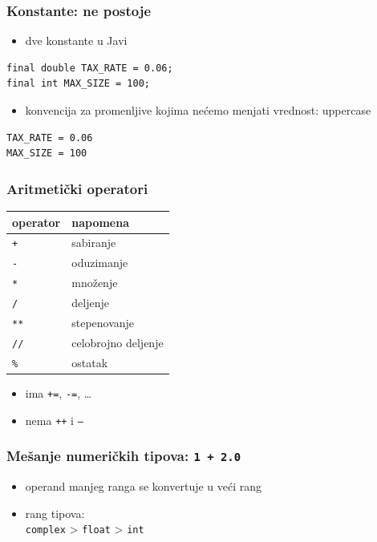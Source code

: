 \documentclass[compress]{beamer}
\begin{document}
\begin{frame}[fragile]
\frametitle{Konstante: ne postoje}
\begin{itemize}
  \item dve konstante u Javi
\end{itemize}
\begin{verbatim}
final double TAX_RATE = 0.06;
final int MAX_SIZE = 100;
\end{verbatim}
\begin{itemize}
  \item konvencija za promenljive kojima nećemo menjati vrednost: uppercase
\end{itemize}
\begin{verbatim}
TAX_RATE = 0.06
MAX_SIZE = 100
\end{verbatim}
\end{frame}

\begin{frame}[fragile]
\frametitle{Aritmetički operatori}
\begin{tabular}{lp{5cm}}
  \textbf{operator} & \textbf{napomena} \\ \hline
  \texttt{+} & sabiranje \\ \hline
  \texttt{-} & oduzimanje \\ \hline
  \texttt{*} & množenje \\ \hline
  \texttt{/} & deljenje \\ \hline
  \texttt{**} & stepenovanje \\ \hline
  \texttt{//} & celobrojno deljenje \\ \hline
  \texttt{\%} & ostatak
\end{tabular}
\begin{itemize}
  \item ima \texttt{+=}, \texttt{-=}, \dots
  \item nema \texttt{++} i \texttt{--}
\end{itemize}
\end{frame}
    
\begin{frame}[fragile]
\frametitle{Mešanje numeričkih tipova: \texttt{1 + 2.0}}
\begin{itemize}
  \item operand manjeg ranga se konvertuje u veći rang
  \item rang tipova: \\
    \texttt{complex} > \texttt{float} > \texttt{int}
\end{itemize}
\end{frame}
    
\end{document}
